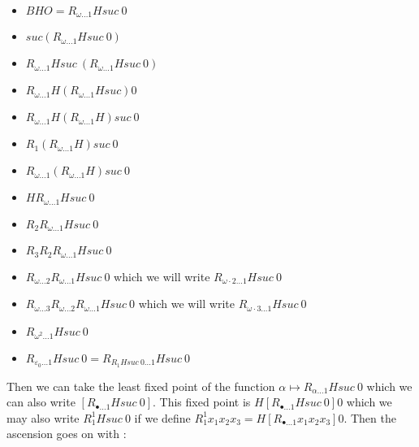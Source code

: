 \documentclass[10pt]{article}
\begin{document}
\begin{itemize}
     \setlength{\itemsep}{1pt}
     \setlength{\parskip}{0pt}
     \setlength{\parsep}{0pt}

\item \( BHO = R_{\omega \ldots 1} H suc\ 0 \)
\item \( suc (R_{\omega \ldots 1} H suc\ 0) \)
\item \( R_{\omega \ldots 1} H suc\ (R_{\omega \ldots 1} H suc\ 0) \)
\item \( R_{\omega \ldots 1} H (R_{\omega \ldots 1} H suc) 0 \)
\item \( R_{\omega \ldots 1} H (R_{\omega \ldots 1} H) suc\ 0 \)
\item \( R_1 (R_{\omega \ldots 1} H) suc\ 0 \)
\item \( R_{\omega \ldots 1} (R_{\omega \ldots 1} H) suc\ 0 \)
\item \( H R_{\omega \ldots 1} H suc\ 0 \)
\item \( R_2 R_{\omega \ldots 1} H suc\ 0 \)
\item \( R_3 R_2 R_{\omega \ldots 1} H suc\ 0 \)
\item \( R_{\omega \ldots 2} R_{\omega \ldots 1} H suc\ 0 \) which we will write \( R_{\omega \cdot 2 \ldots 1} H suc\ 0 \)
\item \( R_{\omega \ldots 3} R_{\omega \ldots 2} R_{\omega \ldots 1} H suc\ 0 \) which we will write \( R_{\omega \cdot 3 \ldots 1} H suc\ 0 \)
\item \( R_{\omega^2 \ldots 1} H suc\ 0 \)
\item \( R_{\varepsilon_0 \ldots 1} H suc\ 0 = R_{R_1 H suc\ 0 \ldots 1} H suc\ 0 \) 

\end{itemize}

Then we can take the least fixed point of the function \( \alpha \mapsto R_{\alpha \ldots 1} H suc\ 0 \) which we can also write \( [R_{\bullet \ldots 1} H suc\ 0] \). This fixed point is \(  H [R_{\bullet \ldots 1} H suc\ 0] 0 \) which we may also write \( R^1_1 H suc\ 0 \) if we define \( R^1_1 x_1 x_2 x_3 = H [R_{\bullet \ldots 1} x_1 x_2 x_3] 0 \). Then the ascension goes on with :
\end{document}
